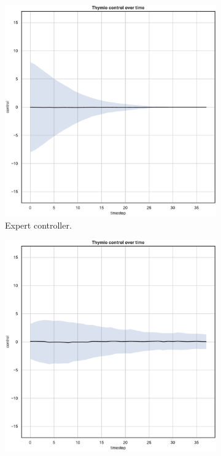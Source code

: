 \begin{figure}[!htb]
	\centering
	\begin{subfigure}[h]{0.3\textwidth}
		\centering
		\includegraphics[width=\textwidth]{contents/images/net-d15/control-overtime-omniscient}%
		\caption{Expert controller.}
	\end{subfigure}
	\hfill
	\begin{subfigure}[h]{0.3\textwidth}
		\centering
		\includegraphics[width=\textwidth]{contents/images/net-d15/control-overtime-manual}%

\end{subfigure}
\end{figure}
